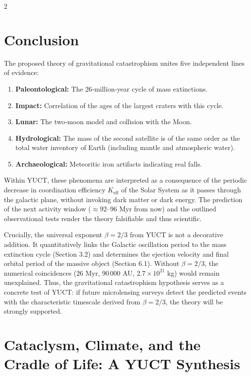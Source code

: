 \documentclass[11pt,a4paper]{article}
\begin{document}
	\begin{multicols}{2}
		
		\section{Conclusion}
		
		The proposed theory of gravitational catastrophism unites five independent lines of evidence:
		\begin{enumerate}
			\item \textbf{Paleontological:} The 26‑million‑year cycle of mass extinctions.
			\item \textbf{Impact:} Correlation of the ages of the largest craters with this cycle.
			\item \textbf{Lunar:} The two‑moon model and collision with the Moon.
			\item \textbf{Hydrological:} The mass of the second satellite is of the same order as the total water inventory of Earth (including mantle and atmospheric water).
			\item \textbf{Archaeological:} Meteoritic iron artifacts indicating real falls.
		\end{enumerate}
		Within YUCT, these phenomena are interpreted as a consequence of the periodic decrease in coordination efficiency \(K_{\mathrm{eff}}\) of the Solar System as it passes through the galactic plane, without invoking dark matter or dark energy. The prediction of the next activity window (\(\approx 92\)–\(96\) Myr from now) and the outlined observational tests render the theory falsifiable and thus scientific.
		
		Crucially, the universal exponent $\beta = 2/3$ from YUCT is not a decorative addition. It quantitatively links the Galactic oscillation period to the mass extinction cycle (Section 3.2) and determines the ejection velocity and final orbital period of the massive object (Section 6.1). Without $\beta = 2/3$, the numerical coincidences ($26$ Myr, $90\,000$ AU, $2.7\times10^{21}$ kg) would remain unexplained. Thus, the gravitational catastrophism hypothesis serves as a concrete test of YUCT: if future microlensing surveys detect the predicted events with the characteristic timescale derived from $\beta = 2/3$, the theory will be strongly supported.
		
		\section{Cataclysm, Climate, and the Cradle of Life: A YUCT Synthesis}
		

\end{multicols}
\end{document}
